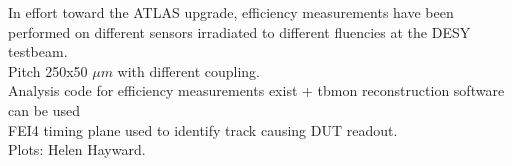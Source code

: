\documentclass{beamer}
\begin{document}
\begin{frame}
\begin{columns}[t]
\tiny{
\vspace{10pt}
 In effort toward the ATLAS upgrade, efficiency measurements have been performed on different sensors irradiated to different fluencies at the DESY testbeam. \\ 
\vspace{10pt}
Pitch 250x50 $\mu m$ with different coupling.\\
\vspace{10pt}
Analysis code for efficiency measurements exist + tbmon reconstruction software can be used \\
\vspace{10pt}
FEI4 timing plane used to identify track causing DUT readout. \\
\vspace{10pt} 
Plots: Helen Hayward.
}
\end{columns}
\end{frame}
\end{document}
